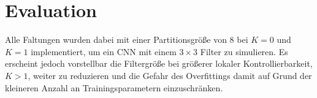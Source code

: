\chapter{Evaluation}
\label{evaluation}






Alle Faltungen wurden dabei mit einer Partitionsgröße von $8$ bei $K=0$ und $K=1$ implementiert, um ein \gls{CNN} mit einem $3 \times 3$ Filter zu simulieren.
Es erscheint jedoch vorstellbar die Filtergröße bei größerer lokaler Kontrollierbarkeit, \dhe{} $K > 1$, weiter zu reduzieren und die Gefahr des Overfittings damit auf Grund der kleineren Anzahl an Trainingsparametern einzuschränken.



